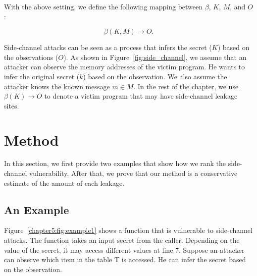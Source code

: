 With the above setting, we define the following mapping between $\beta$,
$K$, $M$, and $O$:

\begin{displaymath}
  \beta(K, M) \rightarrow O.
\end{displaymath}


Side-channel attacks can be seen as a process that infers the secret ($K$) based on the observations ($O$). As shown in Figure~\ref{fig:side_channel}, we assume that an attacker can observe the memory addresses of the victim program. He wants to infer the original secret ($k$) based on the observation. We also assume the attacker knows the known message $m \in M$. In the rest of the chapter, we use $\beta(K) \rightarrow O$ to denote a victim program that may have side-channel leakage sites.




\section{Method}\label{chapter5:method}
In this section, we first provide two examples that show how we rank the side-channel vulnerability. After that, we prove that our method is a conservative estimate of the amount of each leakage.

\subsection{An Example}
Figure~\ref{chapter5:fig:example1} shows a function that is vulnerable to side-channel attacks. The function takes an input secret from the caller. Depending on the value of the secret, it may access different values at line 7. Suppose an attacker can observe which item in the table \textsf{T} is accessed. He can infer the secret based on the observation.

